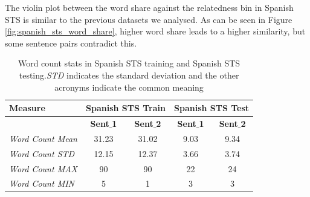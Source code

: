 \begin{enumerate}
The violin plot between the word share against the relatedness bin in Spanish STS is similar to the previous datasets we analysed. As can be seen in Figure \ref{fig:spanish_sts_word_share}, higher word share leads to a higher similarity, but some sentence pairs contradict this.


\begin{table}
	\centering
	\begin{tabular}{l|cc|cc}
		\hline
		Measure   & \multicolumn{2}{c|}{Spanish STS Train} & \multicolumn{2}{c}{Spanish STS Test} \\
		\hline
		\multicolumn{1}{l|}{} & \textbf{Sent$\_$1} & \textbf{Sent$\_$2} & \textbf{Sent$\_$1} & \textbf{Sent$\_$2} \\
		\textit{Word Count Mean} & 31.23 & 31.02 & 9.03 & 9.34  \\
		\textit{Word Count STD} & 12.15 & 12.37 & 3.66 & 3.74  \\
		\textit{Word Count MAX} & 90 & 90 & 22 & 24  \\
		\textit{Word Count MIN} & 5 & 1 & 3 & 3  \\
		\hline
	\end{tabular}
	\caption[Word count stats in Spanish STS]{Word count stats in Spanish STS training and Spanish STS testing.\textit{STD} indicates the standard deviation and the other acronyms indicate the common meaning }
	\label{table:spanish_sts}
\end{table}

	
\end{enumerate}


